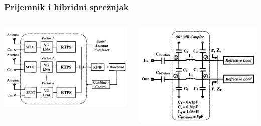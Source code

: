 \documentclass{beamer}
\begin{document}

\begin{frame}
  \frametitle{Prijemnik i hibridni sprežnjak}
  \begin{columns}
    \begin{column}{0.5\textwidth}
      \includegraphics[width=\linewidth]{ellinger_receiver.png}
    \end{column}
    \begin{column}{0.5\textwidth}
      \includegraphics[width=\linewidth]{hybrid_coupler_ellinger.png}
    \end{column}
  \end{columns}
\end{frame}



\end{document}
